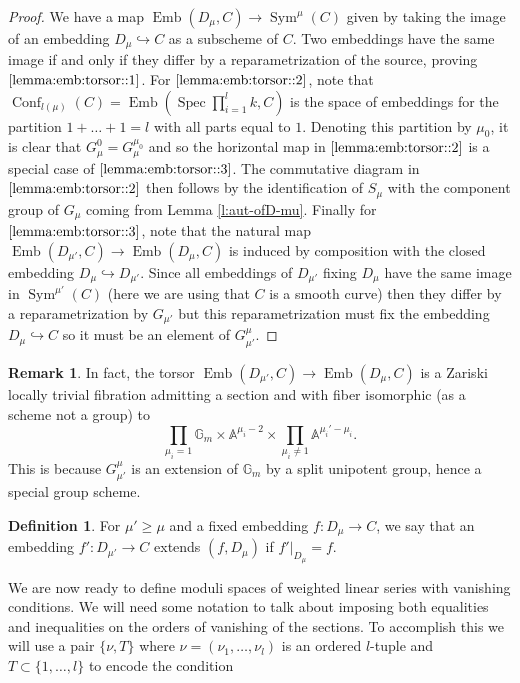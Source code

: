 \documentclass[a4paper,12pt]{amsart}
\theoremstyle{definition}
\newtheorem{defn}[thm]{Definition}
\newtheorem{rmk}[thm]{Remark}
\newcommand{\bG}{\mathbb{G}}
\DeclareMathOperator{\Emb}{Emb}
\DeclareMathOperator{\Conf}{Conf}
\DeclareMathOperator{\Spec}{Spec}
\DeclareMathOperator{\Sym}{Sym}
\begin{document}
	\begin{proof} We have a map $\Emb(D_\mu,C) \to \Sym^\mu(C)$ given by taking the image of an embedding $D_\mu \hookrightarrow C$ as a subscheme of $C$. Two embeddings have the same image if and only if they differ by a reparametrization of the source, proving $\ref{lemma:emb:torsor::1}$. For $\ref{lemma:emb:torsor::2}$, note that $\Conf_{l(\mu)}(C) = \Emb(\Spec \prod_{i = 1}^l k, C)$ is the space of embeddings for the partition $1 + \ldots + 1 = l$ with all parts equal to $1$. Denoting this partition by $\mu_0$, it is clear that $G^0_{\mu} = G^{\mu_0}_\mu$ and so the horizontal map in $\ref{lemma:emb:torsor::2}$ is a special case of $\ref{lemma:emb:torsor::3}$. The commutative diagram in $\ref{lemma:emb:torsor::2}$ then follows by the identification of $S_\mu$ with the component group of $G_\mu$ coming from Lemma \ref{l:aut-ofD-mu}. Finally for $\ref{lemma:emb:torsor::3}$, note that the natural map $\Emb(D_{\mu'}, C) \to \Emb(D_\mu, C)$ is induced by composition with the closed embedding $D_\mu \hookrightarrow D_{\mu'}$. Since all embeddings of $D_{\mu'}$ fixing $D_{\mu}$ have the same image in $\Sym^{\mu'}(C)$ (here we are using that $C$ is a smooth curve) then they differ by a reparametrization by $G_{\mu'}$ but this reparametrization must fix the embedding $D_{\mu} \hookrightarrow C$ so it must be an element of $G_{\mu'}^{\mu}$.
	\end{proof} 
	
	\begin{rmk} In fact, the torsor $\Emb(D_{\mu'}, C) \to \Emb(D_\mu,C)$ is a Zariski locally trivial fibration admitting a section and with fiber isomorphic (as a scheme not a group) to 
		$$
		\prod_{\mu_i = 1} \bG_m \times \mathbb{A}^{\mu_i - 2} \times \prod_{\mu_i \neq 1} \mathbb{A}^{\mu_i' - \mu_i}.
		$$
		This is because $G_{\mu'}^\mu$ is an extension of $\bG_m$ by a split unipotent group, hence a special group scheme.
	\end{rmk}
	
	\begin{defn} For $\mu' \geq \mu$ and a fixed embedding $f : D_\mu \to C$, we say that an embedding $f' : D_{\mu'} \to C$ extends $(f,D_\mu)$ if $f'|_{D_\mu} = f$. 
	\end{defn}
	
	We are now ready to define moduli spaces of weighted linear series with vanishing conditions. We will need some notation to talk about imposing both equalities and inequalities on the orders of vanishing of the sections. To accomplish this we will use a pair $\{\nu, T\}$ where $\nu = (\nu_1, \ldots, \nu_l)$ is an ordered $l$-tuple and $T \subset \{1, \ldots, l\}$ to encode the condition 
	
\end{document}
